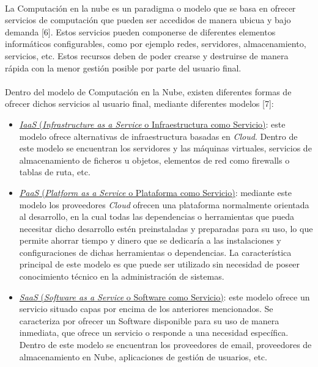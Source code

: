 \documentclass[../../memoria.tex]{subfiles}
\begin{document}
\paragraph{}
La Computación en la nube es un paradigma o modelo que se basa en ofrecer servicios de computación que pueden ser accedidos de manera ubicua y bajo demanda [6]. Estos servicios pueden componerse de diferentes elementos informáticos configurables, como por ejemplo redes, servidores, almacenamiento, servicios, etc. Estos recursos deben de poder crearse y destruirse de manera rápida con la menor gestión posible por parte del usuario final.

\paragraph{}
Dentro del modelo de Computación en la Nube, existen diferentes formas de ofrecer dichos servicios al usuario final, mediante diferentes modelos [7]:

\begin{itemize}
    \item \uline{\textit{IaaS} (\textit{Infrastructure as a Service} o Infraestructura como Servicio)}: este modelo ofrece alternativas de infraestructura basadas en \textit{Cloud}. Dentro de este modelo se encuentran los servidores y las máquinas virtuales, servicios de almacenamiento de ficheros u objetos, elementos de red como firewalls o tablas de ruta, etc.

    \item \uline{\textit{PaaS} (\textit{Platform as a Service} o Plataforma como Servicio)}: mediante este modelo los proveedores \textit{Cloud} ofrecen una plataforma normalmente orientada al desarrollo, en la cual todas las dependencias o herramientas que pueda necesitar dicho desarrollo estén preinstaladas y preparadas para su uso, lo que permite ahorrar tiempo y dinero que se dedicaría a las instalaciones y configuraciones de dichas herramientas o dependencias. La característica principal de este modelo es que puede ser utilizado sin necesidad de poseer conocimiento técnico en la administración de sistemas.

    \item \uline{\textit{SaaS} (\textit{Software as a Service} o Software como Servicio)}: este modelo ofrece un servicio situado capas por encima de los anteriores mencionados. Se caracteriza por ofrecer un Software disponible para su uso de manera inmediata, que ofrece un servicio o responde a una necesidad específica. Dentro de este modelo se encuentran los proveedores de email, proveedores de almacenamiento en Nube, aplicaciones de gestión de usuarios, etc.
\end{itemize}
\end{document}
